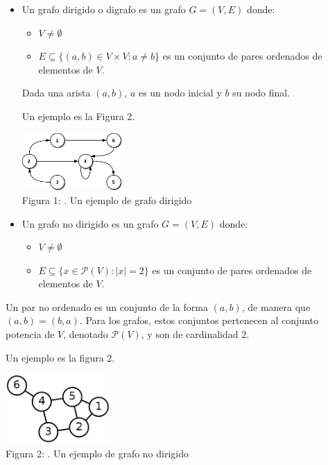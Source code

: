 \begin{itemize}
\item Un grafo dirigido o digrafo es un grafo $G = (V,E)$ donde:
\begin{itemize}
\item $V\not= \emptyset$
\item $E \subseteq \{(a,b) \in V\times V \colon a \not= b\}$ es un conjunto de pares ordenados de elementos de $V$.
\end{itemize}
Dada una arista $(a,b)$, $a$ es un nodo inicial y $b$ su nodo final.

Un ejemplo es la Figura 2. \\
\begin{center}
\includegraphics[width=0.3\textwidth]{grafodirigido} \\
Figura 1: . Un ejemplo de grafo dirigido
\end{center} 






\item Un grafo no dirigido es un grafo $G = (V,E)$ donde:
\begin{itemize}
\item $V\not= \emptyset$
\item $E \subseteq \{x \in \mathcal{P}(V) \colon |x|=2\}$ es un conjunto de pares ordenados de elementos de $V$.
\end{itemize}
\end{itemize}
Un par no ordenado es un conjunto de la forma $(a,b)$, de manera que $(a,b)=(b,a)$. Para los grafos, estos conjuntos pertenecen al conjunto potencia de $V$, denotado $\mathcal{P}(V)$, y son de cardinalidad $2$.

Un ejemplo es la figura 2. \\
\begin{center}
\includegraphics[width=0.3\textwidth]{grafo} \\
Figura 2: . Un ejemplo de grafo no dirigido
\end{center}

